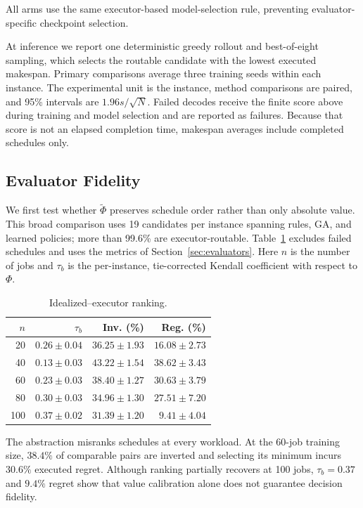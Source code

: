 All arms use the same executor-based model-selection rule, preventing
evaluator-specific checkpoint selection.

At inference we report one deterministic greedy rollout and best-of-eight
sampling, which selects the routable candidate with the lowest executed
makespan. Primary comparisons average three training seeds within each
instance. The experimental unit is the instance, method comparisons are paired,
and 95\% intervals are $1.96s/\sqrt{N}$. Failed decodes receive the finite
score above during training and model selection and are reported as failures.
Because that score is not an elapsed completion time, makespan averages include
completed schedules only.

\subsection{Evaluator Fidelity}
\label{sec:surrogate-results}

We first test whether $\widetilde\Phi$ preserves schedule order rather than only
absolute value. This broad comparison uses 19 candidates per instance spanning
rules, GA, and learned policies; more than 99.6\% are executor-routable.
Table~\ref{tab:ranking} excludes failed schedules and uses the metrics of
Section~\ref{sec:evaluators}. Here $n$ is the number of jobs and $\tau_b$ is the
per-instance, tie-corrected Kendall coefficient with respect to $\Phi$.

\begin{table}[!ht]
\caption{Idealized--executor ranking.}
\label{tab:ranking}
\centering
\scriptsize
\setlength{\tabcolsep}{3.0pt}
\begin{tabular}{@{}rrrr@{}}
\toprule
$n$ & $\tau_b$ & Inv. (\%) & Reg. (\%) \\
\midrule
20  & $0.26\pm0.04$ & $36.25\pm1.93$ & $16.08\pm2.73$ \\
40  & $0.13\pm0.03$ & $43.22\pm1.54$ & $38.62\pm3.43$ \\
60  & $0.23\pm0.03$ & $38.40\pm1.27$ & $30.63\pm3.79$ \\
80  & $0.30\pm0.03$ & $34.96\pm1.30$ & $27.51\pm7.20$ \\
100 & $\mathbf{0.37\pm0.02}$ & $\mathbf{31.39\pm1.20}$ & $\mathbf{9.41\pm4.04}$ \\
\bottomrule
\end{tabular}
\end{table}

The abstraction misranks schedules at every workload. At the 60-job training
size, $38.4\%$ of comparable pairs are inverted and selecting its minimum
incurs $30.6\%$ executed regret. Although ranking partially recovers at 100
jobs, $\tau_b=0.37$ and $9.4\%$ regret show that value calibration alone does
not guarantee decision fidelity.

